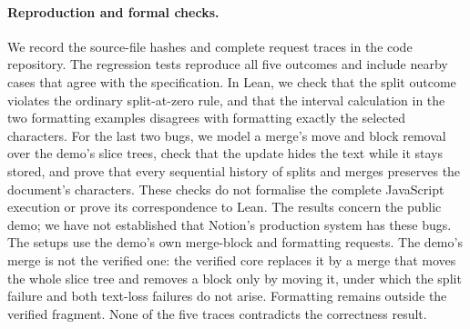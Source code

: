 \paragraph{Reproduction and formal checks.}
We record the source-file hashes and complete request traces in the code repository.
The regression tests reproduce all five outcomes and include nearby cases
that agree with the specification. In Lean, we check that
the split outcome violates the ordinary split-at-zero rule, and that the
interval calculation in the two formatting examples disagrees with
formatting exactly the selected characters. For the last two bugs, we model
a merge's move and block removal over the demo's slice trees, check that
the update hides the text while it stays stored, and prove that every
sequential history of splits and merges preserves the document's characters.
These checks do not formalise
the complete JavaScript execution or prove its correspondence to Lean.
The results concern the public demo; we have not established that Notion's
production system has these bugs. The setups use the demo's own merge-block
and formatting requests. The demo's merge is not the verified one: the
verified core replaces it by a merge that moves the whole slice tree and
removes a block only by moving it, under which the split failure and both
text-loss failures do not arise. Formatting remains outside the verified
fragment. None of the five traces contradicts the correctness result.
